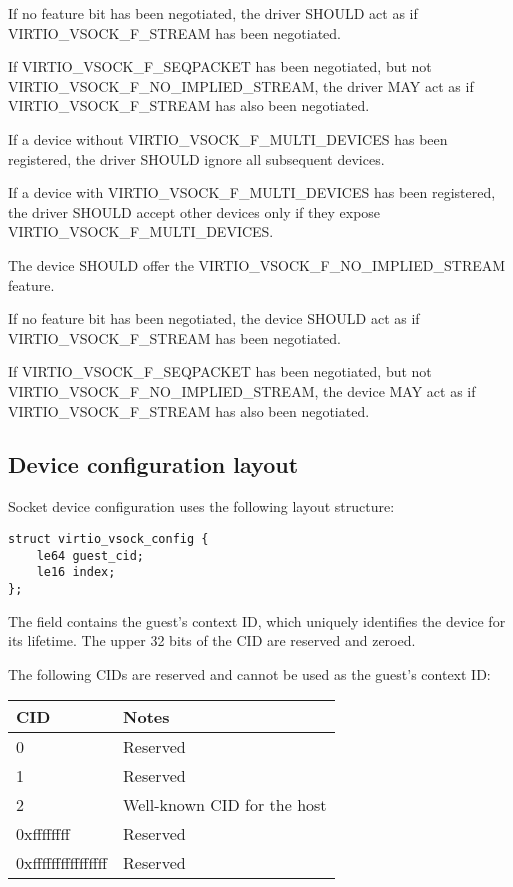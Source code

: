 If no feature bit has been negotiated, the driver SHOULD act as if
VIRTIO_VSOCK_F_STREAM has been negotiated.

If VIRTIO_VSOCK_F_SEQPACKET has been negotiated, but not
VIRTIO_VSOCK_F_NO_IMPLIED_STREAM, the driver MAY act as if
VIRTIO_VSOCK_F_STREAM has also been negotiated.

If a device without VIRTIO_VSOCK_F_MULTI_DEVICES has been registered, the
driver SHOULD ignore all subsequent devices.

If a device with VIRTIO_VSOCK_F_MULTI_DEVICES has been registered, the
driver SHOULD accept other devices only if they expose
VIRTIO_VSOCK_F_MULTI_DEVICES.


The device SHOULD offer the VIRTIO_VSOCK_F_NO_IMPLIED_STREAM feature.

If no feature bit has been negotiated, the device SHOULD act as if
VIRTIO_VSOCK_F_STREAM has been negotiated.

If VIRTIO_VSOCK_F_SEQPACKET has been negotiated, but not
VIRTIO_VSOCK_F_NO_IMPLIED_STREAM, the device MAY act as if
VIRTIO_VSOCK_F_STREAM has also been negotiated.

\subsection{Device configuration layout}\label{sec:Device Types / Socket Device / Device configuration layout}

Socket device configuration uses the following layout structure:

\begin{lstlisting}
struct virtio_vsock_config {
	le64 guest_cid;
	le16 index;
};
\end{lstlisting}

The  field contains the guest's context ID, which uniquely
identifies the device for its lifetime.  The upper 32 bits of the CID are
reserved and zeroed.

The following CIDs are reserved and cannot be used as the guest's context ID:

\begin{tabular}{|l|l|}
\hline
CID    & Notes \\
\hline \hline
0                 & Reserved \\
\hline
1                 & Reserved \\
\hline
2                 & Well-known CID for the host \\
\hline
0xffffffff        & Reserved \\
\hline
0xffffffffffffffff        & Reserved \\
\hline
\end{tabular}

